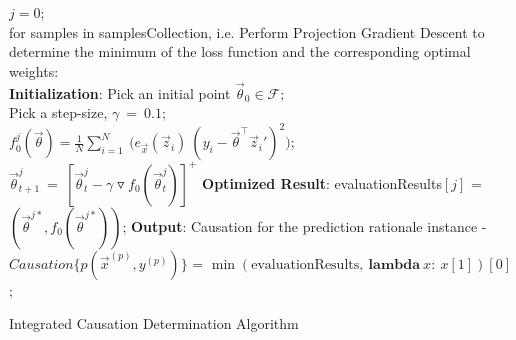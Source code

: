 \documentclass{article}
\begin{document}
\begin{algorithm}[H]
$j = 0$;\\
for samples in samplesCollection, i.e. 
{
    Perform Projection Gradient Descent to determine the minimum of the loss function and the corresponding optimal weights:\\
    {
        \textbf{Initialization}: Pick an initial point $\vec{\theta}_0 \in \mathcal{F}$;
        \\Pick a step-size, $\gamma\ =\ 0.1$;\\
        $f_0^{j}(\vec{\theta}) = \frac{1}{N} \sum_{i=1}^N\ \Big(e_{\vec{x}}(\vec{z}_i)\ (y_i - \vec{\theta}^\intercal \vec{z}_i')^2\Big)$;\\
        {
            $\vec{\theta}^{j}_{t+1}\ =\ [\vec{\theta}^{j}_t - \gamma \triangledown f_0(\vec{\theta}^{j}_t)]^+$\;
        }
        \textbf{Optimized Result}: evaluationResults$[j]$ = $(\vec{\theta}^{j*}, f_0(\vec{\theta}^{j*}))$;
    }
}
\textbf{Output}: Causation for the prediction rationale instance - \\ $Causation\{p(\vec{x}^{(p)}, y^{(p)})\}$ = $\min(\text{evaluationResults},\ \textbf{lambda}\ x:\ x[1])[0]$;
\caption{Integrated Causation Determination Algorithm}
\end{algorithm}
\thispagestyle{empty}
\end{document}
